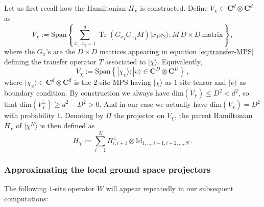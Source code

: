 \documentclass{amsart}
\newcommand{\C}{\mathbf{C}}
\renewcommand{\leq}{\leqslant}
\renewcommand{\geq}{\geqslant}
\newcommand{\Id}{\mathrm{Id}}
\DeclareMathOperator{\Tr}{Tr}
\newcommand{\ket}[1]{| #1 \rangle}
\begin{document}
Let us first recall how the Hamiltonian $H_{\chi}$ is constructed. Define $V_{\chi}\subset \C^d\otimes\C^d$ as
\[ V_{\chi} := \mathrm{Span} \left\{ \sum_{x_1,x_2=1}^d \Tr(G_{x_1}G_{x_2}M)\ket{x_1x_2} : M\ D\times D\ \text{matrix} \right\} \, , \]
where the $G_x$'s are the $D\times D$ matrices appearing in equation \eqref{eq:transfer-MPS} defining the transfer operator $T$ associated to $\ket{\chi}$.
Equivalently,
\begin{equation} \label{eq:W-chi}
    V_{\chi} := \mathrm{Span} \left\{ \ket{\chi_{\upsilon}} : \ket{\upsilon}\in\C^D\otimes\C^D \right\} \, ,
\end{equation}
where $\ket{\chi_{\upsilon}}\in\C^d\otimes\C^d$ is the $2$-site MPS having $\ket{\chi}$ as $1$-site tensor and $\ket{\upsilon}$ as boundary condition.
By construction we always have $\mathrm{dim}(V_{\chi})\leq D^2<d^2$, so that $\mathrm{dim}(V_{\chi}^{\perp})\geq d^2-D^2>0$. And in our case we actually have $\mathrm{dim}(V_{\chi})=D^2$ with probability $1$. Denoting by $\Pi$ the projector on $V_{\chi}$, the parent Hamiltonian $H_{\chi}$ of $\ket{\chi^N}$ is then defined as
\begin{equation} \label{eq:H-parent}
    H_{\chi} := \sum_{i=1}^N \Pi^{\perp}_{i,i+1} \otimes\Id_{1,\ldots,i-1,i+2,\ldots,N}  \, .
\end{equation}

\subsubsection{Approximating the local ground space projectors} \hfill\par\smallskip

The following $1$-site operator $W$ will appear repeatedly in our subsequent computations:
\begin{center}
\end{center}
\end{document}
